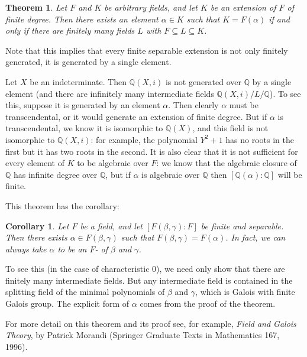 \documentclass[12pt]{article}
\newtheorem{theorem}{Theorem}
\newtheorem{cor}{Corollary}
\begin{document}
\begin{theorem}
Let $F$ and $K$ be arbitrary fields, and let $K$ be an extension of $F$ of finite degree.  Then there exists an element $\alpha\in K$ such that $K=F(\alpha)$ if and only if there are finitely many fields $L$ with $F\subseteq L\subseteq K$.
\end{theorem}

Note that this implies that every finite separable extension is not only finitely generated, it is generated by a single element.  

Let $X$ be an indeterminate.  Then $\mathbb{Q}(X,i)$ is not generated over $\mathbb{Q}$ by a single element (and there are infinitely many intermediate fields $\mathbb{Q}(X,i)/L/\mathbb{Q}$).  To see this, suppose it is generated by an element $\alpha$. Then clearly $\alpha$ must be transcendental, or it would generate an extension of finite degree.  But if $\alpha$ is transcendental, we know it is isomorphic to $\mathbb{Q}(X)$, and this field is not isomorphic to $\mathbb{Q}(X,i)$: for example, the polynomial $Y^2+1$ has no roots in the first but it has two roots in the second.  It is also clear that it is not sufficient for every element of $K$ to be algebraic over $F$: we know that the algebraic closure of $\mathbb{Q}$ has infinite degree over $\mathbb{Q}$, but if $\alpha$ is algebraic over $\mathbb{Q}$ then $[\mathbb{Q}(\alpha):\mathbb{Q}]$ will be finite.  

This theorem has the corollary:
\begin{cor}
Let $F$ be a field, and let $[F(\beta,\gamma):F]$ be finite and separable.  Then there exists $\alpha \in F(\beta,\gamma)$ such that $F(\beta,\gamma)=F(\alpha)$. In fact, we can always take $\alpha$ to be an $F$- of $\beta$ and $\gamma$. 
\end{cor}

To see this (in the case of characteristic $0$), we need only show that there are finitely many intermediate fields.  But any intermediate field is contained in the splitting field of the minimal polynomials of $\beta$ and $\gamma$, which is Galois with finite Galois group. The explicit form of $\alpha$ comes from the proof of the theorem.

For more detail on this theorem and its proof see, for example, \emph{Field and Galois Theory}, by Patrick Morandi (Springer Graduate Texts in Mathematics 167, 1996).
\end{document}
